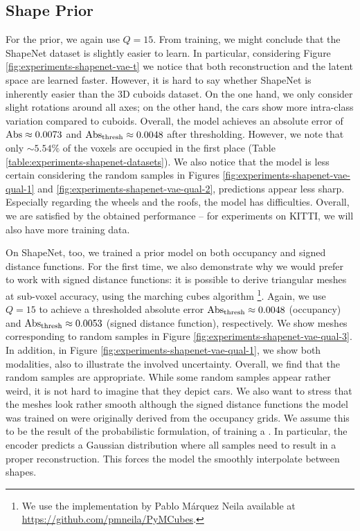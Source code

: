 \subsection{Shape Prior}




For the \VAE prior, we again use $Q = 15$.
From training, we might conclude that the
ShapeNet dataset is slightly easier to learn. In particular, considering
Figure \ref{fig:experiments-shapenet-vae-t} we notice that both reconstruction
and the latent space are learned faster. However, it is hard to say whether
ShapeNet is inherently easier than the 3D cuboids dataset. On the one hand, we
only consider slight rotations around all axes; on the other hand,
the cars show more intra-class variation compared to cuboids. Overall,
the model achieves an absolute error of $\text{Abs} \approx 0.0073$ and
$\AbsThr \approx 0.0048$ after thresholding.
However, we note
that only $\sim 5.54\%$ of the voxels are occupied in the first place
(\cf Table \ref{table:experiments-shapenet-datasets}).
We also notice that the model is less certain considering the random
samples in Figures \ref{fig:experiments-shapenet-vae-qual-1}
and \ref{fig:experiments-shapenet-vae-qual-2}, \ie predictions
appear less sharp. Especially regarding the wheels and the roofs, the model
has difficulties. Overall, we are satisfied by the obtained performance --
for experiments on KITTI, we will also have more training data.

On ShapeNet, too, we trained a prior model on both occupancy and signed
distance functions. For the first time, we also demonstrate why
we would prefer to work with signed distance functions: it is possible
to derive triangular meshes at sub-voxel accuracy, \eg
using the marching cubes algorithm \cite{LorensenCline:1987}\footnote{
  We use the implementation by Pablo M\'{a}rquez Neila available at
  \url{https://github.com/pmneila/PyMCubes}.
}. Again, we use $Q = 15$ to achieve a thresholded absolute error $\AbsThr \approx 0.0048$
(occupancy) and $\AbsThr \approx 0.0053$ (signed distance function), respectively.
We show meshes corresponding to random samples in Figure
\ref{fig:experiments-shapenet-vae-qual-3}. In addition,
in Figure \ref{fig:experiments-shapenet-vae-qual-1},
we show both modalities, also to illustrate the involved uncertainty.
Overall, we find that the random samples are appropriate. While some random samples
appear rather weird, it is not hard to imagine that they depict cars.
We also want to stress that the meshes look rather smooth although the
signed distance functions the model was trained on were originally derived
from the occupancy grids. We assume this to be the result of the probabilistic
formulation, \ie of training a \VAE. In particular, the encoder predicts
a Gaussian distribution where all samples need to result in a proper reconstruction.
This forces the model the smoothly interpolate between shapes.

